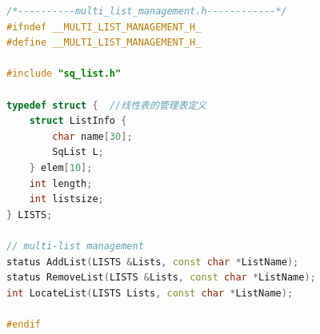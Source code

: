 \documentclass[supercite]{Experimental_Report}
\theoremstyle{definition}
\begin{document}
\newpage
\begin{lstlisting}[caption={$multi\_list\_management.h$}, language=C++, frame=single]
/*----------multi_list_management.h------------*/
#ifndef __MULTI_LIST_MANAGEMENT_H_
#define __MULTI_LIST_MANAGEMENT_H_

#include "sq_list.h"

typedef struct {  //线性表的管理表定义
    struct ListInfo {
        char name[30];
        SqList L;
    } elem[10];
    int length;
    int listsize;
} LISTS;

// multi-list management
status AddList(LISTS &Lists, const char *ListName);
status RemoveList(LISTS &Lists, const char *ListName);
int LocateList(LISTS Lists, const char *ListName);

#endif
\end{lstlisting}
\end{document}
